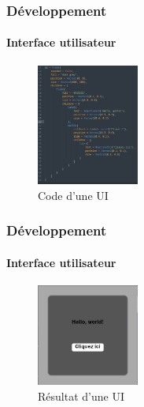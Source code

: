 \begin{frame}
	\frametitle{Développement}
	\framesubtitle{Interface utilisateur}
	\begin{figure}
		\includegraphics[width=0.3\textwidth]{img/code_ui.png}
		\caption{Code d'une UI}
	\end{figure}
\end{frame}
\begin{frame}
	\frametitle{Développement}
	\framesubtitle{Interface utilisateur}
	\begin{figure}
		\includegraphics[width=0.3\textwidth]{img/ui.png}
		\caption{Résultat d'une UI}
	\end{figure}

\end{frame}